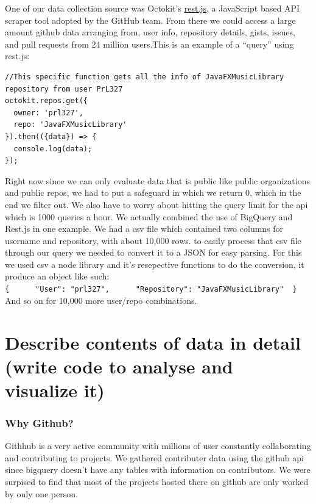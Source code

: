 \documentclass[11pt]{article}
\begin{document}
One of our data collection source was Octokit's
\href{https://github.com/octokit/rest.js}{rest.js}, a JavaScript based
API scraper tool adopted by the GitHub team. From there we could access
a large amount github data arranging from, user info, repository
details, gists, issues, and pull requests from 24 million users.This is
an example of a ``query'' using rest.js:

\begin{verbatim}
//This specific function gets all the info of JavaFXMusicLibrary repository from user PrL327
octokit.repos.get({
  owner: 'prl327',
  repo: 'JavaFXMusicLibrary'
}).then(({data}) => {
  console.log(data);
}); 
\end{verbatim}

Right now since we can only evaluate data that is public like public
organizations and public repos, we had to put a safeguard in which we
return 0, which in the end we filter out. We also have to worry about
hitting the query limit for the api which is 1000 queries a hour. We
actually combined the use of BigQuery and Rest.js in one example. We had
a csv file which contained two columns for username and repository, with
about 10,000 rows. to easily process that csv file through our query we
needed to convert it to a JSON for easy parsing. For this we used csv a
node library and it's resepective functions to do the conversion, it
produce an object like such:
\texttt{\{\ \ \ \ \ \ "User":\ "prl327",\ \ \ \ \ \ "Repository":\ "JavaFXMusicLibrary"\ \ \}}
And so on for 10,000 more user/repo combinations.

    \hypertarget{describe-contents-of-data-in-detail-write-code-to-analyse-and-visualize-it}{%
\section{Describe contents of data in detail (write code to analyse and
visualize
it)}\label{describe-contents-of-data-in-detail-write-code-to-analyse-and-visualize-it}}

    \hypertarget{why-github}{%
\subsubsection{Why Github?}\label{why-github}}

Githhub is a very active community with millions of user constantly
collaborating and contributing to projects. We gathered contributer data
using the github api since bigquery doesn't have any tables with
information on contributors. We were surpised to find that most of the
projects hosted there on github are only worked by only one person.
\end{document}

